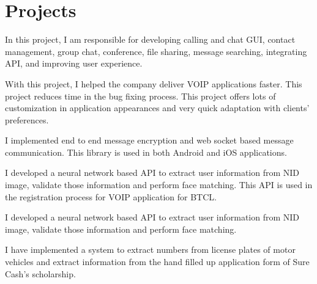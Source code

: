 \documentclass[]{al-jamil-suvo-resume-openfont}
\begin{document}
\begin{minipage}[t]{0.66\textwidth} 



\section{Projects}
In this project, I am responsible for developing  calling and chat GUI, contact management, group chat, conference, file sharing, message searching, integrating API, and improving user experience. 
\sectionsep

With this project, I helped the company deliver VOIP applications faster. This project reduces time in the bug fixing process.
This project offers lots of customization in application appearances and very quick adaptation with clients' preferences. 
\sectionsep

I implemented end to end message encryption and web socket based message communication. This library is used in both Android and iOS applications. 
\sectionsep

I developed a neural network based API to extract user information from NID image, validate those information and perform face matching. This API is used in the registration  process for VOIP application for BTCL.
\sectionsep

I developed a neural network based API to extract user information from NID image, validate those information and perform face matching. 
\sectionsep

 I have implemented a system to extract numbers from  license plates of motor vehicles  and extract information from  the hand filled up application form of Sure Cash’s scholarship. 
\sectionsep


\end{minipage}
\end{document}
